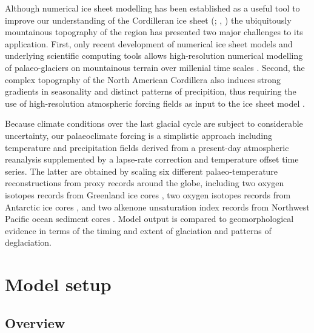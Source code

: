\documentclass[tc, manuscript]{copernicus}
\begin{document}
Although numerical ice sheet modelling has been established as a useful tool to
improve our understanding of the Cordilleran ice sheet
    (\citealp[p.~227]{Jackson.Clague.1991}; \citealp{Robert.1991},
     \citealp{Marshall.etal.2000})
the ubiquitously mountainous
topography of the region has presented two major challenges to its application.
First, only recent development of numerical ice sheet models and underlying
scientific computing tools \citep{Bueler.Brown.2009, Balay.etal.2014} allows
high-resolution numerical modelling of palaeo-glaciers on mountainous terrain
over millenial time scales \citep[e.g.,][]{Golledge.etal.2012}. Second, the
complex
topography of the North American Cordillera also induces strong gradients in
seasonality and distinct patterns of precipition, thus requiring the use of
high-resolution atmospheric forcing fields as input to the ice sheet model
\citep{Seguinot.etal.2014}.

Because climate conditions over the last glacial cycle are subject to
considerable uncertainty, our palaeoclimate forcing is a simplistic approach
including temperature and precipitation fields derived from a
present-day atmospheric reanalysis \citep{Mesinger.etal.2006,
Seguinot.etal.2014} supplemented by a lapse-rate correction
and temperature offset time series. The latter are obtained by scaling six
different palaeo-temperature reconstructions from proxy records around the
globe, including two oxygen isotopes records from Greenland ice cores
\citep{Dansgaard.etal.1993, Andersen.etal.2004}, two oxygen isotopes
records from Antarctic ice cores \citep{Petit.etal.1999,Jouzel.etal.2007},
and two alkenone unsaturation index records from Northwest Pacific ocean
sediment cores \citep{Herbert.etal.2001}. Model output is compared to
geomorphological evidence in terms of the timing and extent of glaciation and
patterns of deglaciation.


\section{Model setup}
\label{sec:model}

\subsection{Overview}
\end{document}
